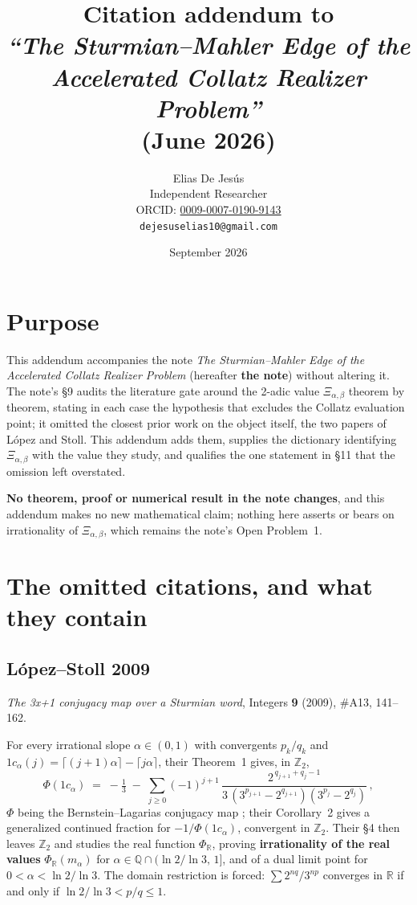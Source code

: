 \documentclass[10pt]{article}
\title{Citation addendum to \\
\emph{``The Sturmian--Mahler Edge of the Accelerated Collatz Realizer Problem''} \\
{\normalsize (June 2026)}}
\author{Elias De Jes\'us\\
\small Independent Researcher\\
\small ORCID: \href{https://orcid.org/0009-0007-0190-9143}{0009-0007-0190-9143}\\
\small \texttt{dejesuselias10@gmail.com}}
\date{September 2026}
\newcommand{\Ztwo}{\mathbb{Z}_2}
\newcommand{\Xab}{\Xi_{\alpha,\beta}}
\begin{document}
\maketitle\vspace{-2.5em}

\section*{Purpose}

This addendum accompanies the note \emph{The Sturmian--Mahler Edge of the Accelerated Collatz
Realizer Problem} \cite{dejesus2026sturmianmahler} (hereafter \textbf{the note}) without altering
it. The note's \S9 audits the literature gate around the 2-adic value $\Xab$ theorem by theorem,
stating in each case the hypothesis that excludes the Collatz evaluation point; it omitted the
closest prior work on the object itself, the two papers of L\'opez and Stoll. This addendum adds
them, supplies the dictionary identifying $\Xab$ with the value they study, and qualifies the one
statement in \S11 that the omission left overstated.

\textbf{No theorem, proof or numerical result in the note changes}, and this addendum makes no new
mathematical claim; nothing here asserts or bears on irrationality of $\Xab$, which remains the
note's Open Problem~1.

\section{The omitted citations, and what they contain}

\subsection*{L\'opez--Stoll 2009 \cite{lopez2009conjugacy}}

\emph{The 3x+1 conjugacy map over a Sturmian word}, Integers \textbf{9} (2009), \#A13, 141--162.

For every irrational slope $\alpha\in(0,1)$ with convergents $p_k/q_k$ and
$1c_\alpha(j)=\lceil(j+1)\alpha\rceil-\lceil j\alpha\rceil$, their Theorem~1 gives, in $\Ztwo$,
\begin{equation}
\Phi(1c_\alpha) \;=\; -\tfrac13 \;-\; \sum_{j\ge 0} (-1)^{j+1}\,
\frac{2^{\,q_{j+1}+q_j-1}}{3\,(3^{p_{j+1}}-2^{q_{j+1}})(3^{p_j}-2^{q_j})}\,,
\label{eq:ls}
\end{equation}
$\Phi$ being the Bernstein--Lagarias conjugacy map \cite{bernstein1996conjugacy}; their
Corollary~2 gives a generalized continued fraction for $-1/\Phi(1c_\alpha)$, convergent in $\Ztwo$.
Their \S4 then leaves $\Ztwo$ and studies the real function $\Phi_{\mathbb{R}}$, proving
\textbf{irrationality of the real values} $\Phi_{\mathbb{R}}(m_\alpha)$ for
$\alpha\in\mathbb{Q}\cap(\ln 2/\ln 3,\,1]$, and of a dual limit point for
$0<\alpha<\ln 2/\ln 3$. The domain restriction is forced: $\sum 2^{nq}/3^{np}$ converges in
$\mathbb{R}$ if and only if $\ln 2/\ln 3 < p/q \le 1$.
\end{document}
